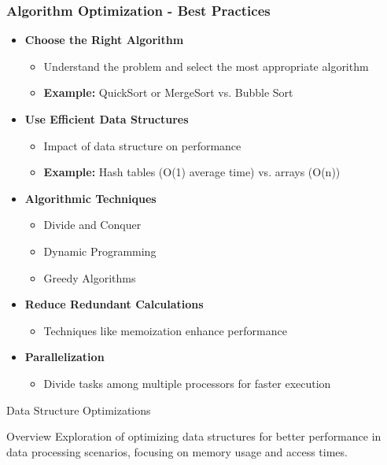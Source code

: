 \documentclass[aspectratio=169]{beamer}
\begin{document}
\begin{frame}[fragile]
    \frametitle{Algorithm Optimization - Best Practices}
    \begin{itemize}
        \item \textbf{Choose the Right Algorithm}
        \begin{itemize}
            \item Understand the problem and select the most appropriate algorithm
            \item \textbf{Example:} QuickSort or MergeSort vs. Bubble Sort
        \end{itemize}
        
        \item \textbf{Use Efficient Data Structures}
        \begin{itemize}
            \item Impact of data structure on performance
            \item \textbf{Example:} Hash tables (O(1) average time) vs. arrays (O(n))
        \end{itemize}
        
        \item \textbf{Algorithmic Techniques}
        \begin{itemize}
            \item Divide and Conquer
            \item Dynamic Programming
            \item Greedy Algorithms
        \end{itemize}
        
        \item \textbf{Reduce Redundant Calculations}
        \begin{itemize}
            \item Techniques like memoization enhance performance
        \end{itemize}

        \item \textbf{Parallelization}
        \begin{itemize}
            \item Divide tasks among multiple processors for faster execution
        \end{itemize}
    \end{itemize}
\end{frame}

\begin{frame}{Data Structure Optimizations}
  \begin{block}{Overview}
    Exploration of optimizing data structures for better performance in data processing scenarios, focusing on memory usage and access times.
  \end{block}
\end{frame}
\end{document}
